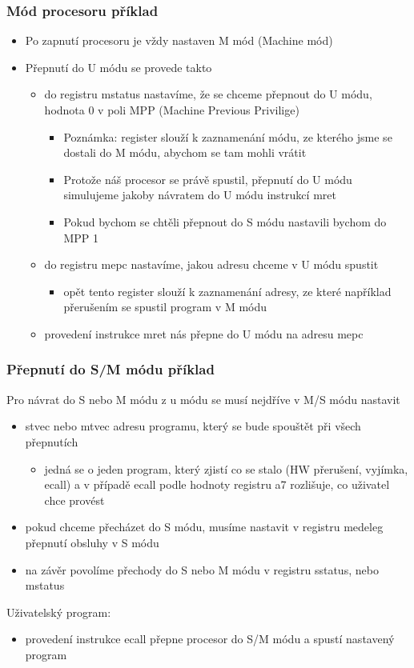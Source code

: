 \documentclass{beamer}
\begin{document}
\begin{frame}
\frametitle{Mód procesoru příklad}

\begin{itemize}
 \item Po zapnutí procesoru je vždy nastaven M mód (Machine mód)
\item Přepnutí do U módu se provede takto
 \begin{itemize}
 \item do registru mstatus nastavíme, že se chceme přepnout do U módu, hodnota 0 v poli MPP (Machine Previous Privilige)
\begin{itemize}
 \item Poznámka: register slouží k zaznamenání módu, ze kterého jsme se dostali do M módu, abychom se tam mohli vrátit
 \item Protože náš procesor se právě spustil, přepnutí do U módu simulujeme jakoby návratem do U módu instrukcí mret
 \item Pokud bychom se chtěli přepnout do S módu nastavili bychom do MPP 1
\end{itemize}
 \item do registru mepc nastavíme, jakou adresu chceme v U módu spustit
\begin{itemize}
 \item opět tento register slouží k zaznamenání adresy, ze které například přerušením se spustil program v M módu
\end{itemize}
 \item provedení instrukce mret nás přepne do U módu na adresu mepc
\end{itemize}
\end{itemize}
\end{frame}


\begin{frame}
\frametitle{Přepnutí do S/M módu příklad}

Pro návrat do S nebo M módu z u módu se musí nejdříve v M/S módu nastavit
\begin{itemize}
\item stvec nebo mtvec adresu programu, který se bude spouštět při všech přepnutích
 \begin{itemize}
 \item jedná se o jeden program, který zjistí co se stalo (HW přerušení, vyjímka, ecall) a v případě ecall podle hodnoty registru a7 rozlišuje, co uživatel chce provést
 \end{itemize}
\item pokud chceme přecházet do S módu, musíme nastavit v registru medeleg přepnutí obsluhy v S módu
\item na závěr povolíme přechody do S nebo M módu v registru sstatus, nebo mstatus
\end{itemize}

Uživatelský program:
\begin{itemize}
\item provedení instrukce ecall přepne procesor do S/M módu a spustí nastavený program
\end{itemize}
\end{frame}
\end{document}
